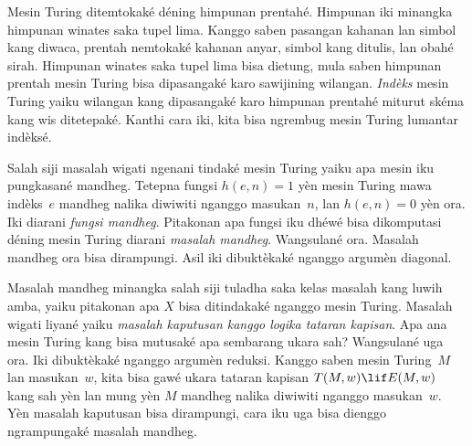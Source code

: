 Mesin Turing ditemtokaké déning himpunan prentahé. Himpunan
iki minangka himpunan winates saka tupel lima. Kanggo saben
pasangan kahanan lan simbol kang diwaca, prentah nemtokaké
kahanan anyar, simbol kang ditulis, lan obahé sirah.
Himpunan winates saka tupel lima bisa dietung, mula saben
himpunan prentah mesin Turing bisa dipasangaké karo sawijining
wilangan. \emph{Indèks} mesin Turing yaiku wilangan kang
dipasangaké karo himpunan prentahé miturut skéma kang wis
ditetepaké. Kanthi cara iki, kita bisa ngrembug mesin Turing
lumantar indèksé.

Salah siji masalah wigati ngenani tindaké mesin Turing yaiku
apa mesin iku pungkasané mandheg. Tetepna fungsi $h(e,n)=1$
yèn mesin Turing mawa indèks~$e$ mandheg nalika diwiwiti
nganggo masukan~$n$, lan $h(e,n)=0$ yèn ora. Iki diarani
\emph{fungsi mandheg}. Pitakonan apa fungsi iku dhéwé bisa
dikomputasi déning mesin Turing diarani \emph{masalah mandheg}.
Wangsulané ora. Masalah mandheg ora bisa dirampungi. Asil iki
dibuktèkaké nganggo argumèn diagonal.

Masalah mandheg minangka salah siji tuladha saka kelas masalah
kang luwih amba, yaiku pitakonan apa $X$ bisa ditindakaké
nganggo mesin Turing. Masalah wigati liyané yaiku
\emph{masalah kaputusan kanggo logika tataran kapisan}.
Apa ana mesin Turing kang bisa mutusaké apa sembarang ukara
sah? Wangsulané uga ora. Iki dibuktèkaké nganggo argumèn
reduksi. Kanggo saben mesin Turing~$M$ lan masukan~$w$,
kita bisa gawé ukara tataran kapisan $T(M,w)\lif E(M,w)$
kang sah yèn lan mung yèn $M$ mandheg nalika diwiwiti nganggo
masukan~$w$. Yèn masalah kaputusan bisa dirampungi, cara iku
uga bisa dienggo ngrampungaké masalah mandheg.
